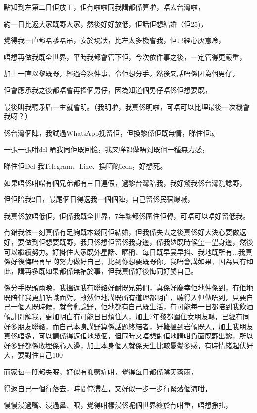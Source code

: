 點知到左第二日佢放工，佢冇啦啦同我講都係算啦，唔去台灣啦，

約一日比返大家既野大家，然後好好放低，佢話佢想結婚（佢25)，

覺得我一直都唔嗲唔吊，安於現狀，比左太多機會我，佢已經心灰意冷，

唔想再做我既全世界，平時我都會管下佢，今次依件事之後，一定管得更嚴重，

加上一直以黎既野，經過今次件事，令佢想分手。然後又話唔係因為個男仔，

佢會應承我之後都唔會再搵個男仔，因為知道個男仔唔係佢想要既，

最後叫我聽矛盾一生就會明。（我明啦，我真係明啦，可唔可以比埋最後一次機會我呀？）

係台灣個陣，我試過WhatsApp挽留佢，但換黎係佢既無情，睇住佢ig

一張一張咁del 晒我同佢既回憶，我又咩都做唔到既個一種無力感，

睇住佢Del 我Telegram、Line、換晒啲icon，好想死。

如果唔係咁啱有個兄弟都有三日連假，過黎台灣陪我，我好驚我係台灣亂諗野，

但佢陪我2日，最尾個日得返我一個個陣，自己留係民宿爆喊，

我真係放唔低佢，佢係我既全世界，7年黎都係圍住佢轉，可唔可以唔好留低我。

冇錯我依一刻真係冇足夠既本錢同佢結婚，但我係失去之後真係好大決心要做返好，要做到佢想要既野，我只係想佢留係我身邊，係我攰既時候望一望身邊，然後可以繼續努力。好掛住大家既外星話、暱稱、每日既早晨早抖、我地既所有...我真係好後悔唔再早啲努力做好自己，比到你想要既野你，我唔會講如果，因為只有如此，講再多既如果都係無補於事，但我真係好後悔同好嬲自己。

係分手既頭兩晚，我搵返我冇聯絡好耐既兄弟們，真係好慶幸佢地仲係到，冇佢地既陪伴我更加唔識面對，雖然佢地講既所有道理都明白，聽得入但做唔到，只要自己一個人既時候，就會亂諗野，佢地都有自己既生活，冇可能每一日都陪到我飲酒傾計開解我，更加明白冇可能日日煩住人，加上7年黎都圍住女朋友轉，已經冇同好多朋友聯絡，而自己本身講野算係話題終結者，好難搵到岩傾既人，加上我朋友真係唔多，可以講係得返佢地幾個，但同時又唔想對佢地講咁負面既野出黎，所以好多野都係收埋係心入邊，加上本身個人就係天生比較憂鬱多感，有時情緒起伏好大，要對住自己100%

而家每一晚都失眠，好似有抑鬱症咁，覺得每日都係陰天落雨，

得返自己一個行落去，時間停滯左，又好似一步一步行緊落個海咁，

慢慢浸過嘴、浸過鼻、眼，覺得咁樣浸係呢個世界終於冇咁重，唔想掙扎，

